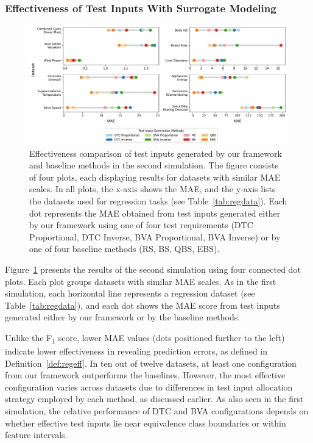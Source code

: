 \documentclass[
]{ceurart}
\theoremstyle{definition}
\begin{document}
\subsubsection{Effectiveness of Test Inputs With Surrogate Modeling}
\begin{figure}
\centering
\includegraphics[width=\linewidth]{img/mae_plot}
\caption{Effectiveness comparison of test inputs generated by our framework and baseline methods in the second simulation. The figure consists of four plots, each displaying results for datasets with similar MAE scales. In all plots, the x-axis shows the MAE, and the y-axis lists the datasets used for regression tasks (see Table~\ref{tab:regdata}). Each dot represents the MAE obtained from test inputs generated either by our framework using one of four test requirements (DTC Proportional, DTC Inverse, BVA Proportional, BVA Inverse) or by one of four baseline methods (RS, BS, QBS, EBS).}
\label{fig:mae}
\end{figure}

Figure~\ref{fig:mae} presents the results of the second simulation using four connected dot plots. Each plot groups datasets with similar MAE scales. As in the first simulation, each horizontal line represents a regression dataset (see Table~\ref{tab:regdata}), and each dot shows the MAE score from test inputs generated either by our framework or by the baseline methods.

Unlike the F\textsubscript{1} score, lower MAE values (dots positioned further to the left) indicate lower effectiveness in revealing prediction errors, as defined in Definition~\ref{def:regeff}. In ten out of twelve datasets, at least one configuration from our framework outperforms the baselines. However, the most effective configuration varies across datasets due to differences in test input allocation strategy employed by each method, as discussed earlier. As also seen in the first simulation, the relative performance of DTC and BVA configurations depends on whether effective test inputs lie near equivalence class boundaries or within feature intervals.
\end{document}
